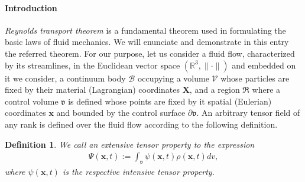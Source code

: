 \documentclass[12pt]{article}
\newtheorem{definition*}{Definition}
\begin{document}
\paragraph{Introduction}
{\em Reynolds transport theorem} \cite{cite:Reynolds} is a fundamental theorem used in formulating the basic laws of fluid mechanics. We will enunciate and demonstrate in this entry the referred theorem. For our purpose, let us consider a fluid flow, characterized by its streamlines, in the Euclidean vector space $(\mathbb{R}^3,\lVert\cdot\rVert)$ and embedded on it we consider, a continuum body $\mathscr{B}$ occupying a volume $\mathscr{V}$ whose particles are fixed by their material (Lagrangian) coordinates $\mathbf{X}$, and a region $\Re$ where a control volume $\mathfrak{v}$ is defined whose points are fixed by it spatial (Eulerian) coordinates $\mathbf{x}$ and bounded by the control surface $\partial\mathfrak{v}$. An arbitrary tensor field of any rank is defined over the fluid flow according to the following definition. 
\begin{definition*} We call an {\em extensive tensor property} to the expression
\begin{align}
\Psi(\mathbf{x},t):=
\int_{\mathfrak{v}}\psi(\mathbf{x},t)\rho(\mathbf{x},t)dv,
\end{align}
where $\psi(\mathbf{x},t)$ is the respective {\em intensive tensor property}.
\end{definition*}
\end{document}
